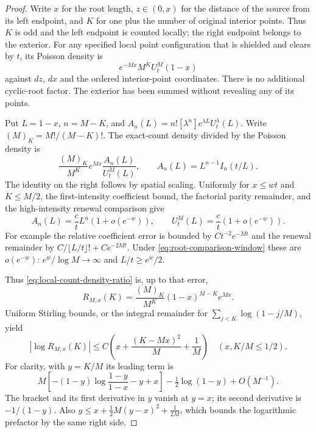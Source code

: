 \documentclass[11pt,letterpaper]{article}
\begin{document}
\begin{proof}
Write $x$ for the root length, $z\in(0,x)$ for the distance of
the source from its left endpoint, and $K$ for one plus the number
of original interior points. Thus $K$ is odd and the left endpoint
is counted locally; the right endpoint belongs to the exterior.
For any specified local point configuration that is shielded and
clears by $t$, its Poisson density is
\[
 e^{-Mx}M^K U_t^M(1-x)
\]
against $dz$, $dx$ and the ordered interior-point coordinates.
There is no additional cyclic-root factor. The exterior has been
summed without revealing any of its points.

Put $L=1-x$, $n=M-K$, and
$A_n(L)=n![\lambda^n]e^{\lambda L}U_t^\lambda(L)$.
Write $(M)_K=M!/(M-K)!$. The exact-count density divided by the
Poisson density is
\begin{equation}\label{eq:local-count-density-ratio}
 \frac{(M)_K}{M^K}e^{Mx}\frac{A_n(L)}{U_t^M(L)},
 \qquad A_n(L)=L^{n-1}I_n(t/L).
\end{equation}
The identity on the right follows by spatial scaling. Uniformly
for $x\le wt$ and $K\le M/2$, the first-intensity coefficient
bound, the factorial parity remainder, and the high-intensity
renewal comparison give
\[
 A_n(L)=\frac c t L^n(1+o(e^{-w})),\qquad
 U_t^M(L)=\frac c t(1+o(e^{-w})).
\]
For example the relative coefficient error is bounded by
$Ct^{-2}e^{-Mt}$ and the renewal remainder by
$C/\lfloor L/t\rfloor!+Ce^{-2Mt}$. Under
\eqref{eq:root-comparison-window} these are $o(e^{-w})$:
$e^w/\log M\to\infty$ and $L/t\ge e^w/2$.

Thus \eqref{eq:local-count-density-ratio} is, up to that error,
\[
 R_{M,x}(K)=\frac{(M)_K}{M^K}(1-x)^{M-K}e^{Mx}.
\]
Uniform Stirling bounds, or the integral remainder for
$\sum_{j<K}\log(1-j/M)$, yield
\begin{equation}\label{eq:local-count-Stirling}
 |\log R_{M,x}(K)|
 \le C\left(x+\frac{(K-Mx)^2}{M}+\frac1M\right)
                 \quad (x,K/M\le1/2).
\end{equation}
For clarity, with $y=K/M$ its leading term is
\[
 M\left[-(1-y)\log\frac{1-y}{1-x}-y+x\right]
                  -\tfrac12\log(1-y)+O(M^{-1}).
\]
The bracket and its first derivative in $y$ vanish at $y=x$;
its second derivative is $-1/(1-y)$. Also
$y\le x+\tfrac12M(y-x)^2+\tfrac1{2M}$, which bounds the logarithmic
prefactor by the same right side.


\end{proof}
\end{document}
